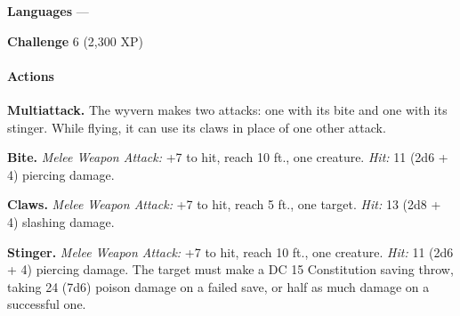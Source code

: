 \documentclass[
]{article}
\begin{document}
\textbf{Languages} ---

\textbf{Challenge} 6 (2,300 XP)

\hypertarget{actions-3}{%
\paragraph{Actions}\label{actions-3}}

\textbf{Multiattack.} The wyvern makes two attacks: one with its bite
and one with its stinger. While flying, it can use its claws in place of
one other attack.

\textbf{Bite.} \emph{Melee Weapon Attack:} +7 to hit, reach 10 ft., one
creature. \emph{Hit:} 11 (2d6 + 4) piercing damage.

\textbf{Claws.} \emph{Melee Weapon Attack:} +7 to hit, reach 5 ft., one
target. \emph{Hit:} 13 (2d8 + 4) slashing damage.

\textbf{Stinger.} \emph{Melee Weapon Attack:} +7 to hit, reach 10 ft.,
one creature. \emph{Hit:} 11 (2d6 + 4) piercing damage. The target must
make a DC 15 Constitution saving throw, taking 24 (7d6) poison damage on
a failed save, or half as much damage on a successful one.
\end{document}
